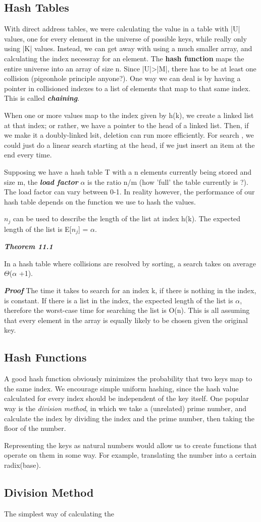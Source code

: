 \documentclass{article}
\begin{document}
\subsection{Hash Tables}
With direct address tables, we were calculating the value in a table with |U| values, one for every element 
in the universe of possible keys, while really only using |K| values. Instead, we can get away with using a 
much smaller array, and calculating the index necessray for an element. The \textbf{hash function} maps the
entire universe into an array of size n. Since |U|>|M|, there has to be at least one collision (pigeonhole
principle anyone?). One way we can deal is by having a pointer in collisioned indexes to a list of 
elements that map to that same index. This is called \textbf{\textit{chaining}}.

When one or more values map to the index given by h(k), we create a linked list at that index; or rather, we 
have a pointer to the head of a linked list. Then, if we make it a doubly-linked lsit, deletion can run
more efficiently. For search , we could just do a linear search starting at the head, if we just insert 
an item at the end every time. 

Supposing we have a hash table T with a n elements currently being stored and size m, the 
\textit{\textbf{load factor}} $\alpha$ is the ratio n/m (how 'full' the table currently is ?). The load 
factor can vary between 0-1. In reality however, the performance of our hash table depends on the 
function we use to hash the values. 

$n_{j}$ can be used to describe the length of the list at index h(k). The expected length of the list is 
E[$n_{j}$] = $\alpha$.

\textbf{\textit{Theorem 11.1}}

In a hash table where collisions are resolved by sorting, a search takes on average $\Theta$($\alpha$ +1).

\textbf{\textit{Proof}} The time it takes to search for an index k, if there is nothing in the index, is constant.
If there is a list in the index, the expected length of the list is $\alpha$, therefore the worst-case
time for searching the list is O(n). This is all assuming that every element in the array is equally likely 
to be chosen given the original key.
\subsection{Hash Functions}
A good hash function obviously minimizes the probability that two keys map to the same index. We encourage 
simple uniform hashing, since the hash value calculated for every index should be independent of the key 
itself. One popular way is the \textit{division method}, in which we take a (unrelated) prime number, and 
calculate the index by dividing the index and the prime number, then taking the floor of the number. 

Representing the keys as natural numbers would allow us to create functions that operate on them in some way.
For example, translating the number into a certain radix(base). 
\subsection{Division Method}
The simplest way of calculating the 
\end{document}
